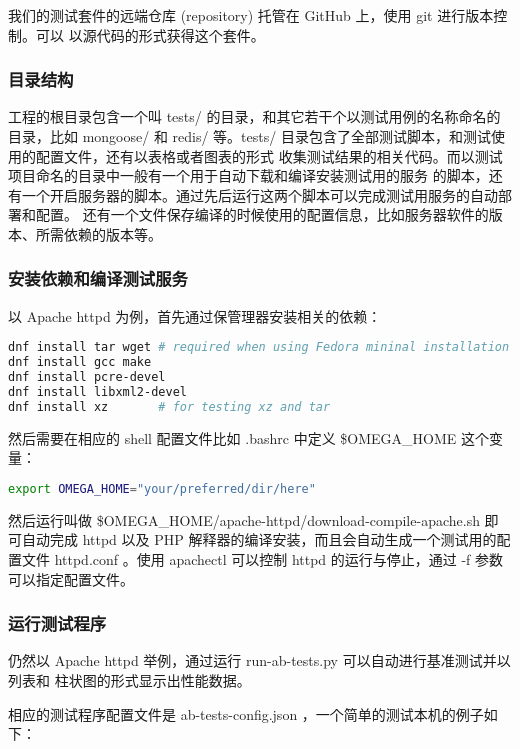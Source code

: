 我们的测试套件的远端仓库 (repository) 托管在 GitHub 上，使用 git 进行版本控制。可以
以源代码的形式获得这个套件。

\subsubsection{目录结构}

工程的根目录包含一个叫 tests/ 的目录，和其它若干个以测试用例的名称命名的目录，比如 mongoose/
和 redis/ 等。tests/ 目录包含了全部测试脚本，和测试使用的配置文件，还有以表格或者图表的形式
收集测试结果的相关代码。而以测试项目命名的目录中一般有一个用于自动下载和编译安装测试用的服务
的脚本，还有一个开启服务器的脚本。通过先后运行这两个脚本可以完成测试用服务的自动部署和配置。
还有一个文件保存编译的时候使用的配置信息，比如服务器软件的版本、所需依赖的版本等。

\subsubsection{安装依赖和编译测试服务}

以 Apache httpd 为例，首先通过保管理器安装相关的依赖：

\begin{lstlisting}[language=bash]
dnf install tar wget # required when using Fedora mininal installation
dnf install gcc make
dnf install pcre-devel
dnf install libxml2-devel
dnf install xz       # for testing xz and tar
\end{lstlisting}

然后需要在相应的 shell 配置文件比如 .bashrc 中定义 \$OMEGA\_HOME 这个变量：

\begin{lstlisting}[language=bash]
export OMEGA_HOME="your/preferred/dir/here"
\end{lstlisting}

然后运行叫做 \$OMEGA\_HOME/apache-httpd/download-compile-apache.sh 即可自动完成
httpd 以及 PHP 解释器的编译安装，而且会自动生成一个测试用的配置文件 httpd.conf 。使用
apachectl 可以控制 httpd 的运行与停止，通过 -f 参数可以指定配置文件。

\subsubsection{运行测试程序}

仍然以 Apache httpd 举例，通过运行 run-ab-tests.py 可以自动进行基准测试并以列表和
柱状图的形式显示出性能数据。

相应的测试程序配置文件是 ab-tests-config.json ，一个简单的测试本机的例子如下：

